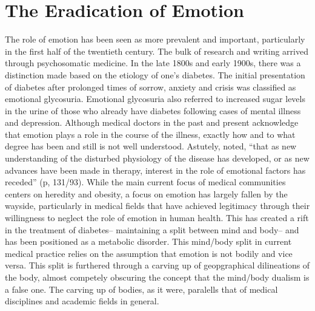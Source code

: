 \documentclass[12pt]{article}
\begin{document}
\section{The Eradication of Emotion} 
\doublespacing
The role of emotion has been seen as more prevalent and important, particularly in the first half of the twentieth century. The bulk of research and writing arrived through psychosomatic medicine. In the late 1800s and early 1900s, there was a distinction made based on the etiology of one's diabetes. The initial presentation of diabetes after prolonged times of sorrow, anxiety and crisis was classified as emotional glycosuria. Emotional glycosuria also referred to increased sugar levels in the urine of those who already have diabetes following cases of mental illness and depression. Although medical doctors in the past and present acknowledge that emotion plays a role in the course of the illness, exactly how and to what degree has been and still is not well understood. Astutely, \citet{burch_1962_role} noted, ``that as new understanding of the disturbed physiology of the disease has developed, or as new advances have been made in therapy, interest in the role of emotional factors has receded'' (p, 131/93). While the main current focus of medical communities centers on heredity and obesity, a focus on emotion has largely fallen by the wayside, particularly in medical fields that have achieved legitimacy through their willingness to neglect the role of emotion in human health. This has created a rift in the treatment of diabetes-- maintaining a split between mind and body-- and has been positioned as a metabolic disorder. This mind/body split in current medical practice relies on the assumption that emotion is not bodily and vice versa. 
This split is furthered through a carving up of geopgraphical dilineations of the body, almost competely obscuring the concept that the mind/body dualism is a false one. The carving up of bodies, as it were, paralells that of medical disciplines and academic fields in general. 
\end{document}
